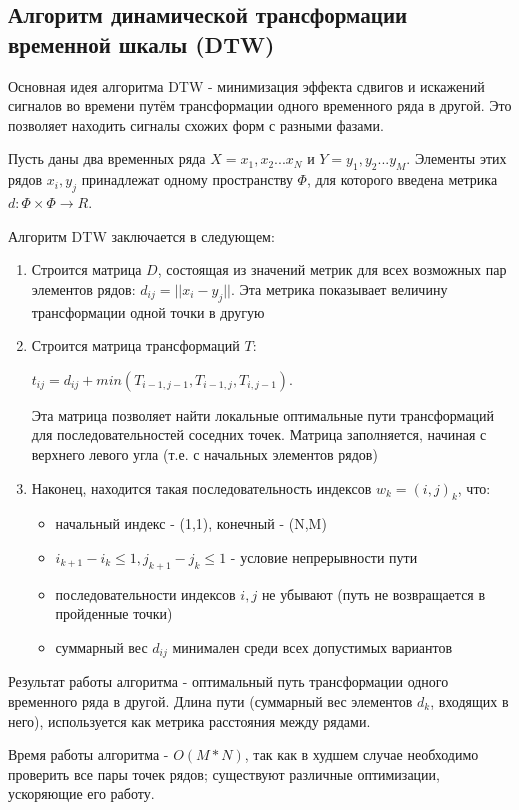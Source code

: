 \subsection{Алгоритм динамической трансформации временной шкалы (DTW)}

Основная идея алгоритма DTW - минимизация эффекта сдвигов и искажений сигналов во времени путём трансформации одного временного ряда в другой. Это позволяет находить сигналы схожих форм с разными фазами\cite{dtw_review}. 

Пусть даны два временных ряда $X=x_1,x_2...x_N$ и $Y=y_1,y_2...y_M$. Элементы этих рядов $x_i,y_j$ принадлежат одному пространству $\Phi$, для которого введена метрика $d: \Phi \times \Phi \to R$. 

Алгоритм DTW заключается в следующем:

\begin{enumerate}
\item Строится матрица $D$, состоящая из значений метрик для всех возможных пар элементов рядов: $d_{ij}=|| x_i-y_j ||$. Эта метрика показывает величину трансформации одной точки в другую
\item Строится матрица трансформаций $T$:

$t_{ij}=d_{ij}+min(T_{i-1,j-1},T_{i-1,j},T_{i,j-1})$. 

Эта матрица позволяет найти локальные оптимальные пути трансформаций для последовательностей соседних точек. Матрица заполняется, начиная с верхнего левого угла (т.е. с начальных элементов рядов)
\item Наконец, находится такая последовательность индексов $w_k=(i,j)_k$, что:
  \begin{itemize}
  \item начальный индекс - (1,1), конечный - (N,M)
  \item $i_{k+1}-i_k \leq 1, j_{k+1}-j_k \leq 1$ - условие непрерывности пути
  \item последовательности индексов $i, j$ не убывают (путь не возвращается в пройденные точки)
  \item суммарный вес $d_{ij}$ минимален среди всех допустимых вариантов
  \end{itemize}
\end{enumerate}

Результат работы алгоритма - оптимальный путь трансформации одного временного ряда в другой. Длина пути (суммарный вес элементов $d_k$, входящих в него), используется как метрика расстояния между рядами. 

Время работы алгоритма - $O(M*N)$, так как в худшем случае необходимо проверить все пары точек рядов; существуют различные оптимизации, ускоряющие его работу.

